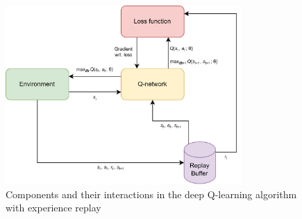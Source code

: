 \begin{figure}[H]
  \centering
  \includegraphics[width=0.8\textwidth]{figures/images/dqn_architecture.png}
  \caption[Deep Q-learning architecture]{Components and their interactions in the deep Q-learning algorithm with experience replay}
  \label{fig:dqn_architecture}
\end{figure}
